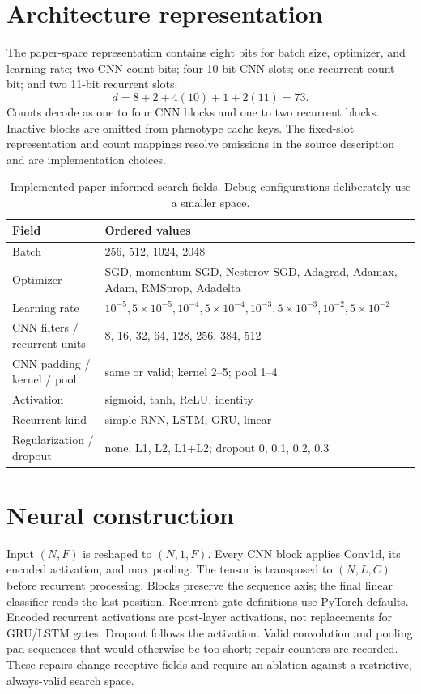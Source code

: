 \documentclass[11pt,a4paper]{report}
\begin{document}
\section{Architecture representation}
The paper-space representation contains eight bits for batch size, optimizer, and learning rate; two CNN-count bits; four 10-bit CNN slots; one recurrent-count bit; and two 11-bit recurrent slots:
\begin{equation}d=8+2+4(10)+1+2(11)=73.\end{equation}
Counts decode as one to four CNN blocks and one to two recurrent blocks. Inactive blocks are omitted from phenotype cache keys. The fixed-slot representation and count mappings resolve omissions in the source description and are implementation choices.

\begin{table}[htbp]\centering\small
\begin{tabular}{lp{10cm}}\toprule
Field & Ordered values\\\midrule
Batch & 256, 512, 1024, 2048\\
Optimizer & SGD, momentum SGD, Nesterov SGD, Adagrad, Adamax, Adam, RMSprop, Adadelta\\
Learning rate & $10^{-5},5\!\times\!10^{-5},10^{-4},5\!\times\!10^{-4},10^{-3},5\!\times\!10^{-3},10^{-2},5\!\times\!10^{-2}$\\
CNN filters / recurrent units & 8, 16, 32, 64, 128, 256, 384, 512\\
CNN padding / kernel / pool & same or valid; kernel 2--5; pool 1--4\\
Activation & sigmoid, tanh, ReLU, identity\\
Recurrent kind & simple RNN, LSTM, GRU, linear\\
Regularization / dropout & none, L1, L2, L1+L2; dropout 0, 0.1, 0.2, 0.3\\\bottomrule
\end{tabular}\caption{Implemented paper-informed search fields. Debug configurations deliberately use a smaller space.}\end{table}

\section{Neural construction}
Input $(N,F)$ is reshaped to $(N,1,F)$. Every CNN block applies Conv1d, its encoded activation, and max pooling. The tensor is transposed to $(N,L,C)$ before recurrent processing. Blocks preserve the sequence axis; the final linear classifier reads the last position. Recurrent gate definitions use PyTorch defaults. Encoded recurrent activations are post-layer activations, not replacements for GRU/LSTM gates. Dropout follows the activation. Valid convolution and pooling pad sequences that would otherwise be too short; repair counters are recorded. These repairs change receptive fields and require an ablation against a restrictive, always-valid search space.
\end{document}
